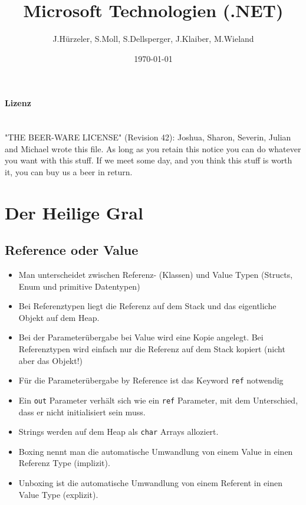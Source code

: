 \documentclass[
a4paper,
oneside,
10pt,
fleqn,
headsepline,
toc=listofnumbered, 
bibliography=totocnumbered]{scrartcl}
\newcommand{\AUTHOR}{J.Hürzeler, S.Moll, S.Dellsperger, J.Klaiber, M.Wieland}
\newcommand{\INSTITUTE}{Fachhochschule OST}
\newcommand{\LICENSE}{
"THE BEER-WARE LICENSE" (Revision 42):
Joshua, Sharon, Severin, Julian and Michael wrote this file. As long as you retain this notice you
can do whatever you want with this stuff. If we meet some day, and you think
this stuff is worth it, you can buy us a beer in return.
}
\let\stdsection\section
\renewcommand\section{\clearpage\stdsection}
\newcommand{\SUBJECT}{Zusammenfassung}
\newcommand{\TITLE}{Microsoft Technologien (.NET)}
\begin{document}
\title{\TITLE}
\subject{\SUBJECT}
\author{\AUTHOR}
\affil{\INSTITUTE}
\date{\today}
\maketitle

\vfill

\paragraph{Lizenz} \hfill \\
\LICENSE

\tableofcontents


\printglossary
\glsaddall


\lstset{style=visual-studio-style}

\section{Der Heilige Gral}
\subsection{Reference oder Value}
\begin{itemize}
	\item Man unterscheidet zwischen Referenz- (Klassen) und Value Typen (Structs, Enum und primitive Datentypen)
	\item Bei Referenztypen liegt die Referenz auf dem Stack und das eigentliche Objekt auf dem Heap.
	\item Bei der Parameterübergabe bei Value wird eine Kopie angelegt. Bei Referenztypen wird einfach nur die Referenz auf dem Stack kopiert (nicht aber das Objekt!)
	\item Für die Parameterübergabe by Reference ist das Keyword \lstinline|ref| notwendig
	\item Ein \lstinline|out| Parameter verhält sich wie ein \lstinline|ref| Parameter, mit dem Unterschied, dass er nicht initialisiert sein muss.
	\item Strings werden auf dem Heap als \lstinline|char| Arrays alloziert.
	\item Boxing nennt man die automatische Umwandlung von einem Value in einen Referenz Type (implizit).
	\item Unboxing ist die automatische Umwandlung von einem Referent in einen Value Type (explizit).
\end{itemize}
\end{document}
